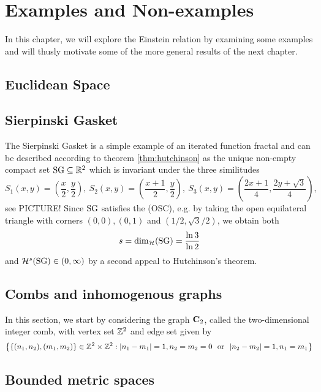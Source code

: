 \chapter{Examples and Non-examples}

In this chapter, we will explore the Einstein relation by examining some examples and will thusly motivate some of the more general results of the next chapter.

\section{Euclidean Space}

\section{Sierpinski Gasket}

The Sierpinski Gasket is a simple example of an iterated function fractal and can be described according to theorem \ref{thm:hutchinson} as the unique non-empty compact set $\operatorname{SG}\subseteq\mathbb{R}^2$ which is invariant under the three similitudes 
\[
  S_1(x,y)=\left(\frac{x}{2},\frac{y}{2}\right),\ 
  S_2(x,y)=\left(\frac{x+1}{2},\frac{y}{2}\right),\ 
  S_3(x,y)=\left(\frac{2x+1}{4},\frac{2y+\sqrt{3}}{4}\right),
\]
see PICTURE! Since $\operatorname{SG}$ satisfies the (OSC), e.g. by taking the open equilateral triangle with corners $(0,0), (0,1)$ and $(1/2,\sqrt{3}/2)$, we obtain both 
\begin{equation}\label{eq:SGdimh}
  s=\dim_{\mathcal{H}}(\operatorname{SG})=\frac{\ln 3}{\ln 2}
\end{equation}
and $\mathcal{H}^s(\operatorname{SG})\in(0,\infty)$ by a second appeal to Hutchinson's theorem. 


\section{Combs and inhomogenous graphs}

In this section, we start by considering the graph $\mathbf{C}_2$, called the two-dimensional integer comb, with vertex set $\mathbb{Z}^2$ and edge set given by
\[
  \left\{\{(n_1,n_2),(m_1,m_2)\}\in\IZ^2\times\IZ^2:|n_1-m_1|=1,n_2=m_2=0\ \text{ or }\ |n_2-m_2|=1,n_1=m_1\right\}
\]


\section{Bounded metric spaces}